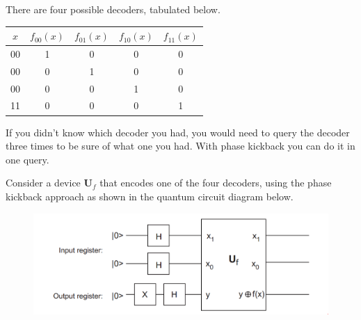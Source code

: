 \documentclass{book}
\theoremstyle{definition}
\newcommand{\U}{\mathbf{U}}
\begin{document}
There are four possible decoders, tabulated below.
\begin{center}
	\begin{tabular}{|c|c|c|c|c|}
		\hline
		$x$ & $f_{00}(x)$ & $f_{01}(x)$ & $f_{10}(x)$ & $f_{11}(x)$  \\
		\hline
		00 & 1 & 0 & 0 & 0\\
		\hline
		00 & 0 & 1 & 0 & 0 \\
		\hline 
		00 & 0& 0 & 1 & 0 \\
		\hline 
		11 & 0 & 0 & 0 & 1\\
		\hline
	\end{tabular}
\end{center}

If you didn't know which decoder you had, you would need to query the decoder three times to be sure of what one you had. With phase kickback you can do it in one query.

Consider a device $\U_f$ that encodes one of the four decoders, using the phase kickback approach as shown in the quantum circuit diagram below.

\begin{figure}[!htb]
	\centering
	\includegraphics[scale=0.4]{phase2}
\end{figure}
\end{document}
